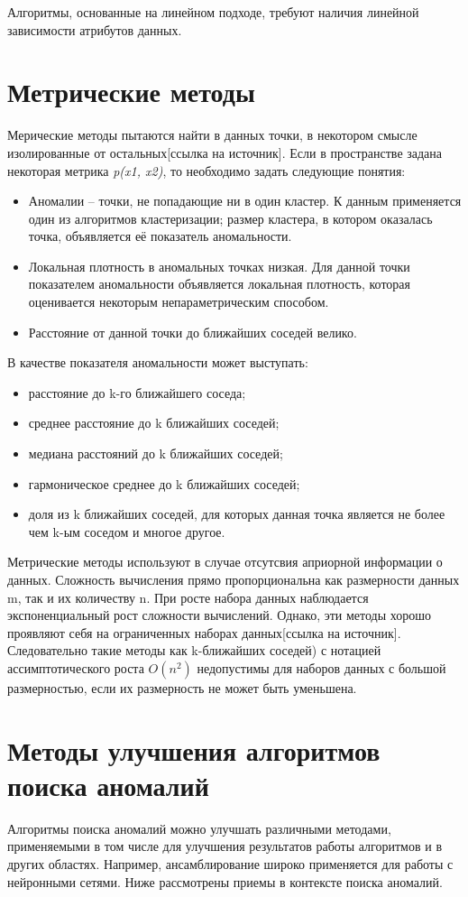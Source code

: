 Алгоритмы, основанные на линейном подходе, требуют  наличия линейной зависимости атрибутов данных. 
\section*{Метрические методы}
Мерические методы пытаются найти в данных точки, в некотором смысле
изолированные от остальных[ссылка на источник]. Если в пространстве задана некоторая метрика \textit{p(x1, x2)}, то необходимо задать следующие понятия:
\begin{itemize}
	\item  Аномалии – точки, не попадающие ни в один кластер. К данным применяется один из алгоритмов кластеризации; размер кластера, в котором оказалась точка, объявляется её показатель аномальности.
	\item Локальная плотность в аномальных точках низкая. Для данной точки показателем аномальности объявляется локальная плотность, которая оценивается некоторым непараметрическим способом.
	\item Расстояние от данной точки до ближайших соседей велико.
\end{itemize}
 В качестве показателя аномальности может выступать:
 \begin{itemize}
\item расстояние до k-го ближайшего соседа;
\item среднее расстояние до k ближайших соседей;
\item медиана расстояний до k ближайших соседей;
\item гармоническое среднее до k ближайших соседей;
\item доля из k ближайших соседей, для которых данная точка является не
более чем k-ым соседом и многое другое.
\end{itemize}

Метрические методы используют в случае отсутсвия априорной информации о данных. Сложность вычисления прямо пропорциональна как размерности данных m, так и их количеству n. При росте набора данных наблюдается экспоненциальный рост сложности вычислений. Однако, эти методы хорошо проявляют себя на ограниченных наборах данных[ссылка на источник]. Следовательно такие методы как k-ближайших соседей) с нотацией ассимптотического роста $O(n^2)$ недопустимы для наборов данных с большой размерностью, если их размерность не может быть уменьшена.



\section*{Методы улучшения алгоритмов поиска аномалий}
Алгоритмы поиска аномалий можно улучшать различными методами, применяемыми в том числе для  улучшения результатов работы алгоритмов и в других областях. Например, ансамблирование широко применяется для работы с нейронными сетями. Ниже рассмотрены приемы в контексте поиска аномалий.
